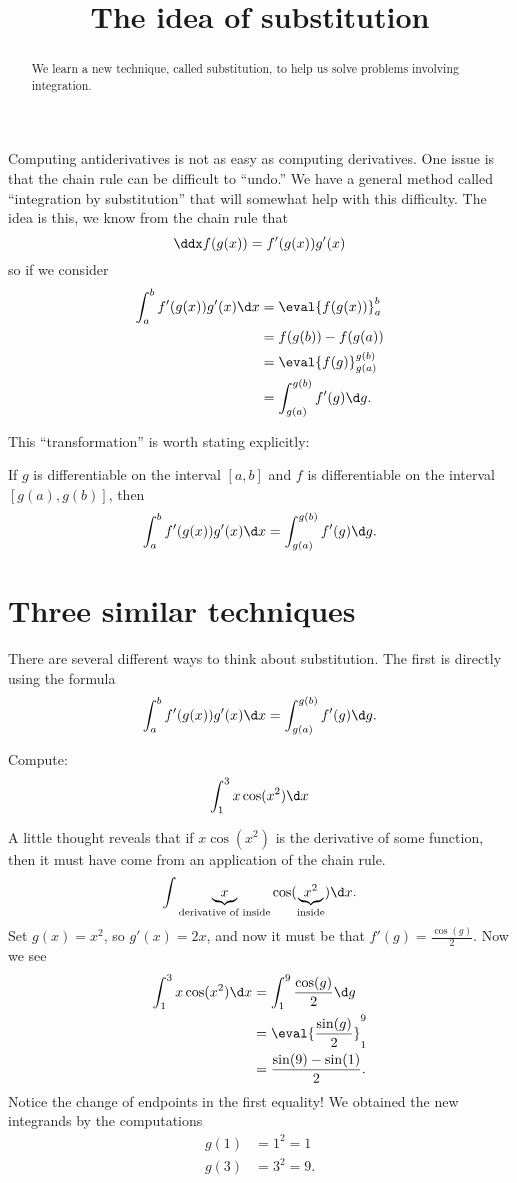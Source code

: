 \documentclass{ximera}
\title[Dig-In:]{The idea of substitution}
\begin{document}
\begin{abstract}
  We learn a new technique, called substitution, to help us solve
  problems involving integration.
\end{abstract}
\maketitle


Computing antiderivatives is not as easy as computing derivatives.
One issue is that the chain rule can be difficult to ``undo.''  We
have a general method called ``integration by substitution'' that will
somewhat help with this difficulty. The idea is this, we know from the
chain rule that
\[
\ddx f(g(x)) = f'(g(x))g'(x)
\]
so if we consider
\begin{align*}
  \int_a^b f'(g(x))g'(x) \d x &= \eval{f(g(x))}_a^b \\
  &= f(g(b)) - f(g(a)) \\
  &= \eval{f(g)}_{g(a)}^{g(b)}\\
  &= \int_{g(a)}^{g(b)}f'(g) \d g.
\end{align*}

This ``transformation'' is worth stating explicitly:

\begin{theorem} 
If $g$ is differentiable on the interval $[a,b]$ and $f$ is
differentiable on the interval $[g(a),g(b)]$, then
\[
\int_a^b f'(g(x)) g'(x) \d x =\int_{g(a)}^{g(b)} f'(g) \d g.
\]
\end{theorem}

\section{Three similar techniques}

There are several different ways to think about substitution. The
first is directly using the formula
\[
\int_a^b f'(g(x)) g'(x) \d x = \int_{g(a)}^{g(b)} f'(g) \d g.
\]
\begin{example}
Compute:
\[
\int_1^3 x\cos(x^2)\d x
\]
\begin{explanation}
A little thought reveals that if $x\cos(x^2)$ is the derivative of
some function, then it must have come from an application of the chain
rule. 
\[
\int \underbrace{x}_{\text{derivative of inside}}\cos(\underbrace{x^2}_{\text{inside}})\d x.
\]
Set $g(x) = x^2$, so $g'(x) = 2x$, and now it must be that $f'(g) =
\frac{\cos(g)}{2}$. Now we see
\begin{align*}
\int_1^3 x\cos(x^2)\d x &= \int_1^9 \frac{\cos(g)}{2}\d g\\
&= \eval{\frac{\sin(g)}{2}}_1^9 \\
&= \frac{\sin(9) -\sin(1)}{2}.
\end{align*}
Notice the change of endpoints in the first equality!  
We obtained the new integrands by the computations
\begin{align*}
g(1) &= 1^2 = 1  \\
g(3) &= 3^2 = 9.
\end{align*}
\end{explanation}
\end{example}
\end{document}

